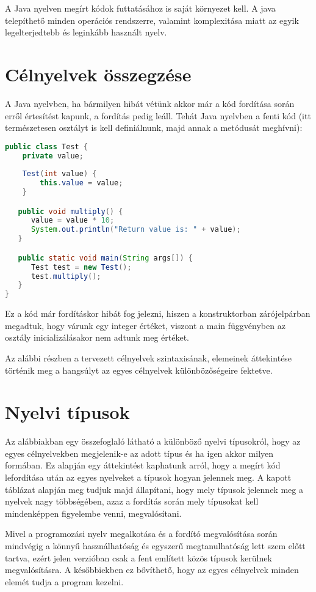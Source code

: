 A Java nyelven megírt kódok futtatásához is saját környezet kell. A java telepíthető minden operációs rendszerre, valamint komplexitása miatt az egyik legelterjedtebb és leginkább használt nyelv.

\section{Célnyelvek összegzése}

A Java nyelvben, ha bármilyen hibát vétünk akkor már a kód fordítása során erről értesítést kapunk, a fordítás pedig leáll. Tehát Java nyelvben a fenti kód (itt természetesen osztályt is kell definiálnunk, majd annak a metódusát meghívni):

\begin{lstlisting}[language=Java]
public class Test {
    private value;
    
    Test(int value) {
        this.value = value;
    }

   public void multiply() {
      value = value * 10;
      System.out.println("Return value is: " + value);
   }

   public static void main(String args[]) {
      Test test = new Test();
      test.multiply();
   }
}
\end{lstlisting}

Ez a kód már fordításkor hibát fog jelezni, hiszen a konstruktorban zárójelpárban megadtuk, hogy várunk egy integer értéket, viszont a main függvényben az osztály inicializálásakor nem adtunk meg értéket. 

Az alábbi részben a tervezett célnyelvek szintaxisának, elemeinek áttekintése történik meg a hangsúlyt az egyes célnyelvek különbözőségeire fektetve.

\section{Nyelvi típusok}

Az alábbiakban egy összefoglaló látható a különböző nyelvi típusokról, hogy az egyes célnyelvekben megjelenik-e az adott típus és ha igen akkor milyen formában. Ez alapján egy áttekintést kaphatunk arról, hogy a megírt kód lefordítása után az egyes nyelveket a típusok hogyan jelennek meg.
A kapott táblázat alapján meg tudjuk majd állapítani, hogy mely típusok jelennek meg a nyelvek nagy többségében, azaz a fordítás során mely típusokat kell mindenképpen figyelembe venni, megvalósítani.

Mivel a programozási nyelv megalkotása és a fordító megvalósítása során mindvégig a könnyű használhatóság és egyszerű megtanulhatóság lett szem előtt tartva, ezért jelen verzióban csak a fent említett közös típusok kerülnek megvalósításra. A későbbiekben ez bővíthető, hogy az egyes célnyelvek minden elemét tudja a program kezelni.

